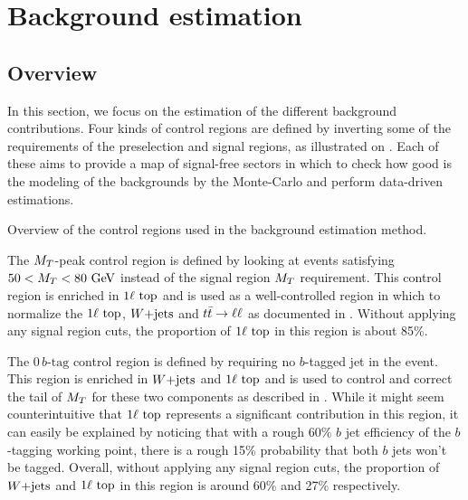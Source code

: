     \section{Background estimation \label{sec:analysis_backgroundEstimation}}

        \subsection{Overview}

    In this section, we focus on the estimation of the different background contributions.
    Four kinds of control regions are defined by inverting some of the requirements of the
    preselection and signal regions, as illustrated on .
    Each of these aims to provide a map of signal-free sectors in which to check how good is the
    modeling of the backgrounds by the Monte-Carlo and perform data-driven estimations.

                     {Overview of the control regions used in the background estimation method.}

    The $M_T$-peak control region is defined by looking at events satisfying $50 < M_T <
    80~\text{GeV}$ instead of the signal region $M_T$ requirement. This control region is enriched
    in $1\ell~\text{top}$ and is used as a well-controlled region in which to normalize the
    $1\ell~\text{top}$, $\text{$W$+jets}$ and $t\bar{t} \rightarrow \ell \ell$ as documented in .
    Without applying any signal region cuts, the proportion of $1\ell~\text{top}$ in this
    region is about 85\%.

    The $0\, b\text{-tag}$ control region is defined by requiring no $b$-tagged jet in the
    event. This region is enriched in $\text{$W$+jets}$ and $1\ell~\text{top}$ and is used to control
    and correct the tail of $M_T$ for these two components as described in .
    While it might seem counterintuitive that $1\ell~\text{top}$ represents a significant
    contribution in this region, it can easily be explained by noticing that with a rough
    60\% $b$ jet efficiency of the $b$-tagging working point, there is a rough 15\% probability
    that both $b$ jets won't be tagged. Overall, without applying any signal region cuts,
    the proportion of $\text{$W$+jets}$ and $1\ell~\text{top}$ in this region is around 60\% and 27\%
    respectively.

